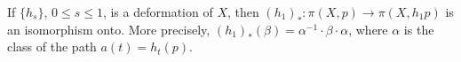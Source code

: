 If $\{h_s\}$, $0 \leq s \leq 1$, is a deformation of $X$, then $(h_1)_*: \pi(X,p) \to \pi(X, h_1p)$ is an isomorphism onto. More precisely, $(h_1)_*(\beta) = \alpha^{-1} \cdot \beta \cdot \alpha$, where $\alpha$ is the class of the path $a(t) = h_t(p)$.
